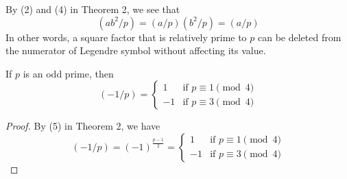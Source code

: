 \begin{remark}
    By (2) and (4) in Theorem 2, we see that
    \[
        (ab^2/p) = (a/p)(b^2/p) = (a/p)
    \]
    In other words, a square factor that is relatively prime to $p$ can be deleted
    from the numerator of Legendre symbol without affecting its value.
\end{remark}


\begin{corollary}
    If $p$ is an odd prime, then 
    \[
        (-1/p) = \begin{cases}
             1 &\text{if } p \equiv 1 \pmod 4\\
            -1 &\text{if } p \equiv 3 \pmod 4
        \end{cases}
    \]
\end{corollary}
\begin{proof}
    By (5) in Theorem 2, we have
    \[
        (-1/p) = {(-1)}^{\frac{p-1}{2}} = \begin{cases}
             1 &\text{if } p \equiv 1 \pmod 4 \\
            -1 &\text{if } p \equiv 3 \pmod 4
        \end{cases}
    \]
\end{proof}